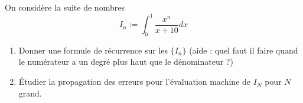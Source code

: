 
\begin{exercice}\label{exoSerieCinq0001}

On considère la suite de nombres
\begin{equation}
	I_n:=\int_0^1\frac{x^n}{x+10}dx
\end{equation}

\begin{enumerate}

	\item
		Donner une formule de récurrence sur les $\{I_n\}$ (aide : quel faut il faire quand le numérateur a un degré plus haut que le dénominateur ?)
	\item
		Étudier la propagation des erreurs pour l'évaluation machine de $I_N$ pour $N$ grand.
\end{enumerate}

\end{exercice}
